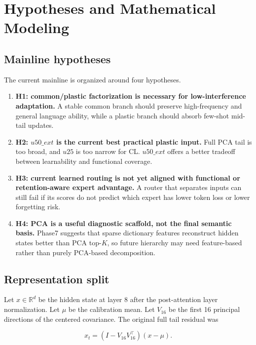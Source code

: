 \documentclass[11pt]{article}
\begin{document}
\section{Hypotheses and Mathematical Modeling}

\subsection{Mainline hypotheses}

The current mainline is organized around four hypotheses.

\begin{enumerate}[leftmargin=1.5em]
    \item \textbf{H1: common/plastic factorization is necessary for low-interference adaptation.}
    A stable common branch should preserve high-frequency and general language ability, while a plastic branch should absorb few-shot mid-tail updates.

    \item \textbf{H2: $u50\_ext$ is the current best practical plastic input.}
    Full PCA tail is too broad, and $u25$ is too narrow for CL. $u50\_ext$ offers a better tradeoff between learnability and functional coverage.

    \item \textbf{H3: current learned routing is not yet aligned with functional or retention-aware expert advantage.}
    A router that separates inputs can still fail if its scores do not predict which expert has lower token loss or lower forgetting risk.

    \item \textbf{H4: PCA is a useful diagnostic scaffold, not the final semantic basis.}
    Phase7 suggests that sparse dictionary features reconstruct hidden states better than PCA top-$K$, so future hierarchy may need feature-based rather than purely PCA-based decomposition.
\end{enumerate}

\subsection{Representation split}

Let $x\in\mathbb{R}^d$ be the hidden state at layer 8 after the post-attention layer normalization. Let $\mu$ be the calibration mean. Let $V_{16}$ be the first 16 principal directions of the centered covariance. The original full tail residual was

$$
x_t=(I-V_{16}V_{16}^{\top})(x-\mu).
$$
\end{document}
